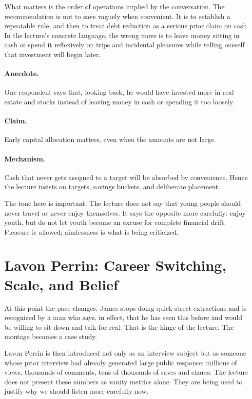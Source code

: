 What matters is the order of operations implied by the conversation. The recommendation is not to save vaguely when convenient. It is to establish a repeatable rule, and then to treat debt reduction as a serious prior claim on cash. In the lecture's concrete language, the wrong move is to leave money sitting in cash or spend it reflexively on trips and incidental pleasures while telling oneself that investment will begin later.

\paragraph{Anecdote.} One respondent says that, looking back, he would have invested more in real estate and stocks instead of leaving money in cash or spending it too loosely.

\paragraph{Claim.} Early capital allocation matters, even when the amounts are not large.

\paragraph{Mechanism.} Cash that never gets assigned to a target will be absorbed by convenience. Hence the lecture insists on targets, savings buckets, and deliberate placement.

The tone here is important. The lecture does not say that young people should never travel or never enjoy themselves. It says the opposite more carefully: enjoy youth, but do not let youth become an excuse for complete financial drift. Pleasure is allowed; aimlessness is what is being criticized.

\section{Lavon Perrin: Career Switching, Scale, and Belief}

At this point the pace changes. James stops doing quick street extractions and is recognized by a man who says, in effect, that he has seen this before and would be willing to sit down and talk for real. That is the hinge of the lecture. The montage becomes a case study.

Lavon Perrin is then introduced not only as an interview subject but as someone whose prior interview had already generated large public response: millions of views, thousands of comments, tens of thousands of saves and shares. The lecture does not present these numbers as vanity metrics alone. They are being used to justify why we should listen more carefully now.

